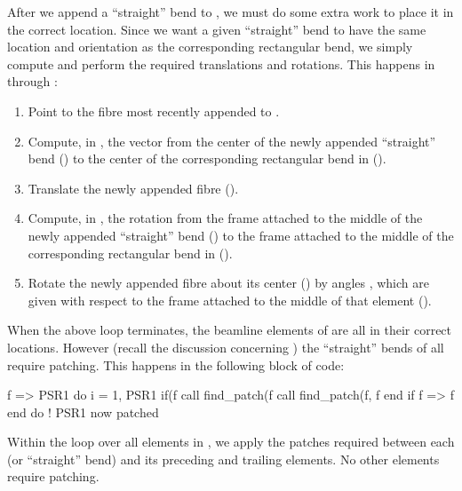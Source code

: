 %
After we append a ``straight'' bend to , we must do
some extra work to place it in the correct location. Since we
want a given ``straight'' bend to have the same location and
orientation as the corresponding rectangular bend, we simply
compute and perform the required translations and rotations.
This happens in  through :
\label{move.elem}
\begin{enumerate}
  \item Point  to the fibre most recently appended to
    .
  \item Compute, in , the vector 
    from the center of the newly appended ``straight'' bend
    ()%
    to the center of the corresponding
    rectangular bend in  ().
  \item Translate the newly appended fibre ().
  \item Compute, in , the rotation 
    from the frame attached to the middle of the newly appended
    ``straight'' bend () to the frame
    attached to the middle of the corresponding rectangular bend
    in  ().%
  \item Rotate the newly appended fibre about its center
    () by angles , which are given
    with respect to the frame attached to the middle of that
    element ().
\end{enumerate}

%
When the above  loop terminates, the beamline elements of
 are all in their correct locations. However (recall the
discussion concerning ) the ``straight'' bends
of  all require patching. This happens in the following
block of code:
%
\begin{ptccode}
f => PSR1%
do i = 1, PSR1%
  if(f%
    call find_patch(f%
    call find_patch(f, f%
  end if
  f => f%
end do ! PSR1 now patched
\end{ptccode}
%
Within the  loop over all elements in , we apply
the patches required between each  (or ``straight'' bend)
and its preceding and trailing elements. No other elements require
patching.

